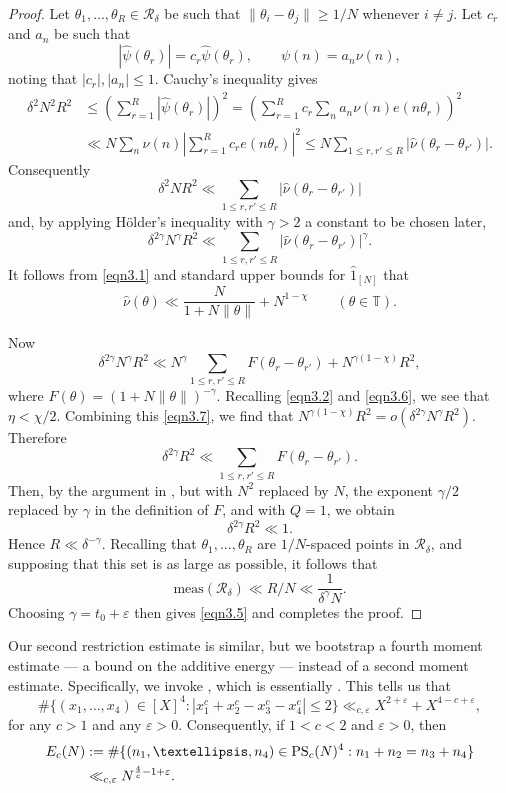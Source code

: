 \documentclass[12pt, reqno]{amsart}
\theoremstyle{definition}
\theoremstyle{remark}
\numberwithin{equation}{section}
\theoremstyle{definition}
\def\gam{{\gamma}} \def\Gam{{\Gamma}}
\def\del{{\delta}} \def\Del{{\Delta}}
\def\tet{{\theta}} \def\bftet{{\boldsymbol \theta}} \def\Tet{{\Theta}}
\def\eps{\varepsilon}
\def\le{\leqslant} \def\ge{\geqslant} \def\pleq{\preccurlyeq} \def\ple{\prec}
\def \bT {\mathbb T}
\def \cR {\mathcal R}
\def \PS {\mathrm{PS}}
\begin{document}
\begin{proof}
Let $\theta_{1}, \ldots,\theta_{R} \in \cR_{\del}$ be such that $\|\theta_{i} -\theta_{j}\| \ge 1/N$ whenever $i \ne j$.
Let $c_{r}$ and $a_n$ be such that 
\[
|\hat{\psi}(\theta_{r})| = c_{r}\hat{\psi}(\theta_{r}), \qquad \psi(n) = a_{n} \nu(n),
\]
noting that $|c_r|, |a_n| \le 1$. Cauchy's inequality gives
\begin{align*}
\delta^{2}N^{2}R^{2} &\le \left( \sum_{r=1}^{R} |\hat{\psi}(\theta_{r})| \right)^{2} = \left(\sum_{r=1}^{R} c_{r}\sum_{n} a_{n} \nu(n)e(n\theta_{r})\right)^{2} \\ &\ll N \sum_{n} \nu(n) \left| \sum_{r=1}^{R} c_{r}e(n\theta_{r}) \right|^{2} \le N \sum_{1 \le r, r' \le R} |\hat{\nu}(\theta_{r}-\theta_{r'})|.
\end{align*}
Consequently
\[
\delta^{2}NR^{2} \ll \sum_{1 \le r, r' \le R} |\hat{\nu}(\theta_{r}-\theta_{r'})|
\]
and, by applying H\"older's inequality with $\gamma >2$ a constant to be chosen later,
\[
\delta^{2\gamma} N^{\gamma}R^{2} \ll \sum_{1 \le r, r' \le R} |\hat{\nu}(\theta_{r}-\theta_{r'})|^{\gamma}.
\]
It follows from \eqref{eqn3.1} and standard upper bounds for $\hat{1}_{[N]}$ that
\[
\hat{\nu}(\theta) \ll \frac{N}{1 + N \| \theta \|} + N^{1-\chi} \qquad (\tet \in \bT).
\]
    
Now
\[
\delta^{2\gamma} N^{\gamma}R^{2} \ll N^{\gamma} \sum_{1 \le r, r' \le R}  F(\theta_{r}-\theta_{r'}) + N^{\gamma(1-\chi)} R^{2},
\]
where $F(\tet) = (1 + N \| \tet \|)^{-\gam}$. Recalling \eqref{eqn3.2} and \eqref{eqn3.6}, we see that $\eta < \chi/2$. Combining this \eqref{eqn3.7}, we find that $N^{\gamma(1-\chi)}R^{2} = o(\delta^{2\gamma} N^{\gamma}R^{2})$. Therefore
\[ \delta^{2\gamma} R^{2} \ll \sum_{1 \le r, r' \le R}  F(\theta_{r}-\theta_{r'}).
\]
Then, by the argument in \cite[Section 4]{B1989}, but with $N^{2}$ replaced by $N$, the exponent $\gamma/2$ replaced by $\gam$ in the definition of $F$, and with $Q=1$, we obtain
\[
\delta^{2\gamma} R^{2} \ll 1.
\]
Hence $R \ll \delta^{-\gamma}$. Recalling that $\theta_{1},...,\theta_{R}$ are $1/N$-spaced points in $\mathcal{R}_{\delta}$, and supposing that this set is as large as possible, it follows that
\[
\mathrm{meas}(\mathcal{R}_{\delta}) \ll R/N \ll \frac{1}{\delta^{\gamma}N}.
\]
Choosing $\gamma = t_{0} + \eps$ then gives \eqref{eqn3.5} and completes the proof.
\end{proof}

Our second restriction estimate is similar, but we bootstrap a fourth moment estimate --- a bound on the additive energy --- instead of a second moment estimate. Specifically, we invoke \cite[Equation 47]{AEM2021}, which is essentially \cite[Theorem 2]{RS2006}. This tells us that
\[
\# \{ (x_1, \ldots, x_4) \in [X]^4:
|x_1^c + x_2^c - x_3^c - x_4^c| \le 2 \} \ll_{c,\eps} X^{2 + \eps} + X^{4-c+\eps},
\]
for any $c > 1$ and any $\eps > 0$.
Consequently, if $1 < c < 2$ and $\eps > 0$, then
\begin{align}
\notag E_c(N) &:=
\# \{ (n_1, \ldots, n_4) \in \PS_c(N)^4: n_1 + n_2 = n_3 + n_4 \}  \\ \label{eqn3.8}
&\ll_{c,\eps}
N^{\frac{4}{c} - 1 + \eps}.
\end{align}
\end{document}
